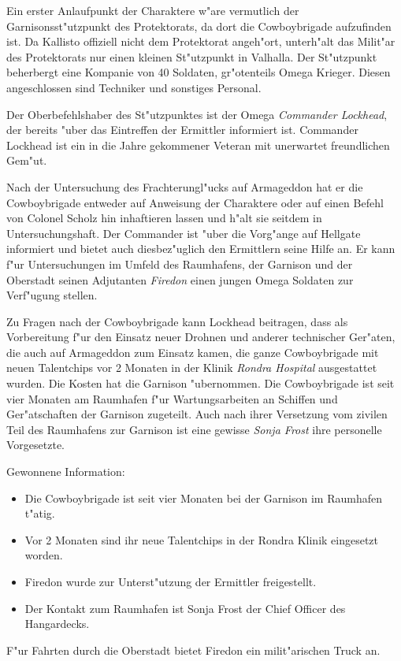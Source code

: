
Ein erster Anlaufpunkt der Charaktere w"are vermutlich der Garnisonsst"utzpunkt des Protektorats, da dort die Cowboybrigade aufzufinden ist. Da Kallisto offiziell nicht dem Protektorat angeh"ort, unterh"alt das Milit"ar des Protektorats nur einen kleinen St"utzpunkt in Valhalla. Der St"utzpunkt beherbergt eine Kompanie von 40 Soldaten, gr"o\3tenteils Omega Krieger. Diesen angeschlossen sind Techniker und sonstiges Personal.

Der Oberbefehlshaber des St"utzpunktes ist der Omega \emph{Commander Lockhead}, der bereits "uber das Eintreffen der Ermittler informiert ist. Commander Lockhead ist ein in die Jahre gekommener Veteran mit unerwartet freundlichen Gem"ut. 

Nach der Untersuchung des Frachterungl"ucks auf Armageddon hat er die Cowboybrigade entweder auf Anweisung der Charaktere oder auf einen Befehl von Colonel Scholz hin inhaftieren lassen und h"alt sie seitdem in Untersuchungshaft. Der Commander ist "uber die Vorg"ange auf Hellgate informiert und bietet auch diesbez"uglich den Ermittlern seine Hilfe an. Er kann f"ur Untersuchungen im Umfeld des Raumhafens, der Garnison und der Oberstadt seinen Adjutanten \emph{Firedon} einen jungen Omega Soldaten zur Verf"ugung stellen. 

Zu Fragen nach der Cowboybrigade kann Lockhead beitragen, dass als Vorbereitung f"ur den Einsatz neuer Drohnen und anderer technischer Ger"aten, die auch auf Armageddon zum Einsatz kamen, die ganze Cowboybrigade mit neuen Talentchips vor 2 Monaten in der Klinik \emph{Rondra Hospital} ausgestattet wurden. Die Kosten hat die Garnison "ubernommen. Die Cowboybrigade ist seit vier Monaten am Raumhafen f"ur Wartungsarbeiten an Schiffen und Ger"atschaften der Garnison zugeteilt. Auch nach ihrer Versetzung vom zivilen Teil des Raumhafens zur Garnison ist eine gewisse \emph{Sonja Frost} ihre personelle Vorgesetzte.

\begin{remarks}
	Gewonnene Information: 
	
	\begin{itemize}
		\item Die Cowboybrigade ist seit vier Monaten bei der Garnison im Raumhafen t"atig. 
		\item Vor 2 Monaten sind ihr neue Talentchips in der Rondra Klinik eingesetzt worden.
		\item Firedon wurde zur Unterst"utzung der Ermittler freigestellt.
		\item Der Kontakt zum Raumhafen ist Sonja Frost der Chief Officer des Hangardecks.
	\end{itemize}

	F"ur Fahrten durch die Oberstadt bietet Firedon ein milit"arischen Truck an.
	 
\end{remarks}

